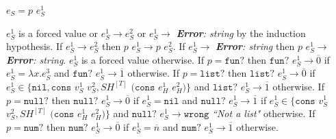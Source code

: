 \begin{case}
$e_{S}=p$ $e_{S}^{1}$

$e_{S}^{1}$ is a forced value or $e_{S}^{1}\rightarrow e_{S}^{2}$ or $e_{S}^{1}\rightarrow$ \emph{\textbf{Error}: string} by the induction hypothesis.  If $e_{S}^{1}\rightarrow e_{S}^{2}$ then $p$ $e_{S}^{1}\rightarrow p$ $e_{S}^{2}$.  If $e_{S}^{1}\rightarrow$ \emph{\textbf{Error}: string} then $p$ $e_{S}^{1}\rightarrow$ \emph{\textbf{Error}: string}.  $e_{S}^{1}$ is a forced value otherwise.  If $p=\mathtt{fun?}$ then $\mathtt{fun?}$ $e_{S}^{1}\rightarrow\overline{0}$ if $e_{S}^{1}=\lambda x.e_{S}^{3}$ and $\mathtt{fun?}$ $e_{S}^{1}\rightarrow\overline{1}$ otherwise.  If $p=\mathtt{list?}$ then $\mathtt{list?}$ $e_{S}^{1}\rightarrow\overline{0}$ if $e_{S}^{1}\in\lbrace\mathtt{nil},\mathtt{cons}$ $v_{S}^{1}$ $v_{S}^{2},SH^{[T]}$ $(\mathtt{cons}$ $e_{H}^{1}$ $e_{H}^{2})\rbrace$ and $\mathtt{list?}$ $e_{S}^{1}\rightarrow\overline{1}$ otherwise.  If $p=\mathtt{null?}$ then $\mathtt{null?}$ $e_{S}^{1}\rightarrow\overline{0}$ if $e_{S}^{1}=\mathtt{nil}$ and $\mathtt{null?}$ $e_{S}^{1}\rightarrow\overline{1}$ if $e_{S}^{1}\in\lbrace\mathtt{cons}$ $v_{S}^{1}$ $v_{S}^{2},SH^{[T]}$ $(\mathtt{cons}$ $e_{H}^{1}$ $e_{H}^{2})\rbrace$ and $\mathtt{null?}$ $e_{S}^{1}\rightarrow\mathtt{wrong}$ \emph{``Not a list"} otherwise.  If $p=\mathtt{num?}$ then $\mathtt{num?}$ $e_{S}^{1}\rightarrow\overline{0}$ if $e_{S}^{1}=\overline{n}$ and $\mathtt{num?}$ $e_{S}^{1}\rightarrow\overline{1}$ otherwise.
\end{case}